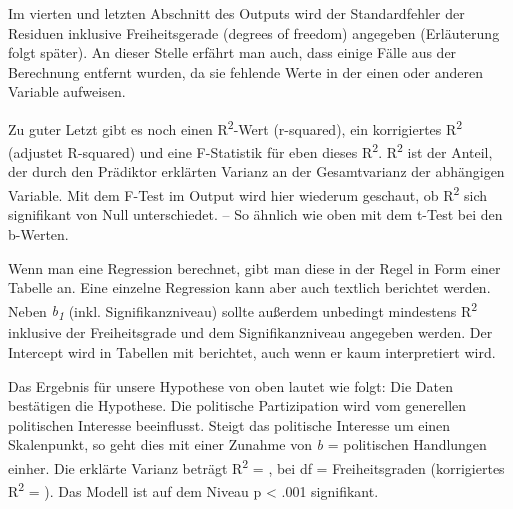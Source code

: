 \documentclass[
]{book}
\newenvironment{Shaded}{\begin{snugshade}}{\end{snugshade}}
\newcommand{\ConstantTok}[1]{\textcolor[rgb]{0.00,0.00,0.00}{#1}}
\newcommand{\DecValTok}[1]{\textcolor[rgb]{0.00,0.00,0.81}{#1}}
\newcommand{\FloatTok}[1]{\textcolor[rgb]{0.00,0.00,0.81}{#1}}
\newcommand{\FunctionTok}[1]{\textcolor[rgb]{0.00,0.00,0.00}{#1}}
\newcommand{\NormalTok}[1]{#1}
\newcommand{\OtherTok}[1]{\textcolor[rgb]{0.56,0.35,0.01}{#1}}
\newcommand{\SpecialCharTok}[1]{\textcolor[rgb]{0.00,0.00,0.00}{#1}}
\newcommand{\StringTok}[1]{\textcolor[rgb]{0.31,0.60,0.02}{#1}}
\begin{document}
Im vierten und letzten Abschnitt des Outputs wird der Standardfehler der Residuen inklusive Freiheitsgerade (degrees of freedom) angegeben (Erläuterung folgt später). An dieser Stelle erfährt man auch, dass einige Fälle aus der Berechnung entfernt wurden, da sie fehlende Werte in der einen oder anderen Variable aufweisen.

Zu guter Letzt gibt es noch einen R\textsuperscript{2}-Wert (r-squared), ein korrigiertes R\textsuperscript{2} (adjustet R-squared) und eine F-Statistik für eben dieses R\textsuperscript{2}. R\textsuperscript{2} ist der Anteil, der durch den Prädiktor erklärten Varianz an der Gesamtvarianz der abhängigen Variable. Mit dem F-Test im Output wird hier wiederum geschaut, ob R\textsuperscript{2} sich signifikant von Null unterschiedet. -- So ähnlich wie oben mit dem t-Test bei den b-Werten.

Wenn man eine Regression berechnet, gibt man diese in der Regel in Form einer Tabelle an. Eine einzelne Regression kann aber auch textlich berichtet werden. Neben \emph{b\textsubscript{1}} (inkl. Signifikanzniveau) sollte außerdem unbedingt mindestens R\textsuperscript{2} inklusive der Freiheitsgrade und dem Signifikanzniveau angegeben werden. Der Intercept wird in Tabellen mit berichtet, auch wenn er kaum interpretiert wird.

\begin{Shaded}
\end{Shaded}

Das Ergebnis für unsere Hypothese von oben lautet wie folgt: Die Daten bestätigen die Hypothese. Die politische Partizipation wird vom generellen politischen Interesse beeinflusst. Steigt das politische Interesse um einen Skalenpunkt, so geht dies mit einer Zunahme von \emph{b} =  politischen Handlungen einher. Die erklärte Varianz beträgt R\textsuperscript{2} = , bei df =  Freiheitsgraden (korrigiertes R\textsuperscript{2} = ). Das Modell ist auf dem Niveau p \textless{} .001 signifikant.
\end{document}

